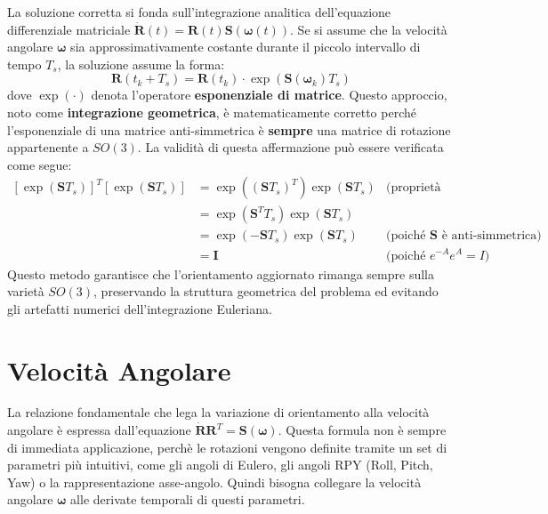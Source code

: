 ﻿\documentclass[11pt, a4paper]{article}
\begin{document}
La soluzione corretta si fonda sull'integrazione analitica dell'equazione differenziale matriciale \(\dot{\bm{R}}(t) = \bm{R}(t)\bm{S}(\bm{\omega}(t))\). Se si assume che la velocità angolare \(\bm{\omega}\) sia approssimativamente costante durante il piccolo intervallo di tempo \(T_s\), la soluzione assume la forma:
\[
    \bm{R}(t_k+T_s) = \bm{R}(t_k) \cdot \exp\left( \bm{S}(\bm{\omega}_k) T_s \right)
\]
dove \(\exp(\cdot)\) denota l'operatore \textbf{esponenziale di matrice}. Questo approccio, noto come \textbf{integrazione geometrica}, è matematicamente corretto perché l'esponenziale di una matrice anti-simmetrica è \textbf{sempre} una matrice di rotazione appartenente a \(SO(3)\). La validità di questa affermazione può essere verificata come segue:
\begin{align*}
    \left[\exp\left(\bm{S}T_s\right)\right]^T \left[\exp\left(\bm{S}T_s\right)\right] &= \exp\left((\bm{S}T_s)^T\right) \exp\left(\bm{S}T_s\right) & \text{(proprietà dell'esponenziale di matrice)} \\
    &= \exp\left(\bm{S}^T T_s\right) \exp\left(\bm{S}T_s\right) \\
    &= \exp\left(-\bm{S} T_s\right) \exp\left(\bm{S}T_s\right) & \text{(poiché \(\bm{S}\) è anti-simmetrica)} \\
    &= \bm{I} & \text{(poiché \(e^{-A}e^{A} = I\))}
\end{align*}
Questo metodo garantisce che l'orientamento aggiornato rimanga sempre sulla varietà \(SO(3)\), preservando la struttura geometrica del problema ed evitando gli artefatti numerici dell'integrazione Euleriana.
\newpage
\section{Velocità Angolare}
La relazione fondamentale che lega la variazione di orientamento alla velocità angolare è espressa dall'equazione \(\dot{\bm{R}}\bm{R}^{T} = \bm{S}(\bm{\omega})\). Questa formula non è sempre di immediata applicazione, perchè le rotazioni vengono definite tramite un set di parametri più intuitivi, come gli angoli di Eulero, gli angoli RPY (Roll, Pitch, Yaw) o la rappresentazione asse-angolo. Quindi bisogna collegare la velocità angolare \(\bm{\omega}\) alle derivate temporali di questi parametri.
\end{document}
